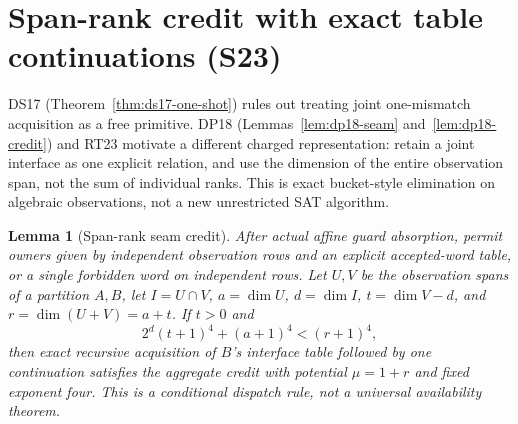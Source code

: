 \documentclass[11pt]{article}
\newtheorem{lemma}[theorem]{Lemma}
\begin{document}
\section{Span-rank credit with exact table continuations (S23)}\label{sec:s23}
DS17 (Theorem~\ref{thm:ds17-one-shot}) rules out treating joint one-mismatch acquisition as a free primitive. DP18 (Lemmas~\ref{lem:dp18-seam} and~\ref{lem:dp18-credit}) and RT23 motivate a different charged representation: retain a joint interface as one explicit relation, and use the dimension of the entire observation span, not the sum of individual ranks. This is exact bucket-style elimination on algebraic observations, not a new unrestricted SAT algorithm.

\begin{lemma}[Span-rank seam credit]\label{lem:s23-span}
After actual affine guard absorption, permit owners given by independent observation rows and an explicit accepted-word table, or a single forbidden word on independent rows. Let $U,V$ be the observation spans of a partition $A,B$, let $I=U\cap V$, $a=\dim U$, $d=\dim I$, $t=\dim V-d$, and $r=\dim(U+V)=a+t$. If $t>0$ and
\[
2^d(t+1)^4+(a+1)^4<(r+1)^4,
\]
then exact recursive acquisition of $B$'s interface table followed by one continuation satisfies the aggregate credit with potential $\mu=1+r$ and fixed exponent four. This is a conditional dispatch rule, not a universal availability theorem.
\end{lemma}
\end{document}
